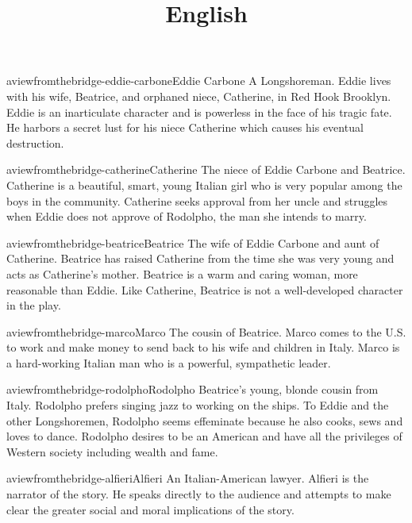 \documentclass[preview]{standalone}
\begin{document}
\title{English}
\genpage

\begin{snippetcharacter}{aviewfromthebridge-eddie-carbone}{Eddie Carbone}
    A Longshoreman. Eddie lives with his wife, Beatrice,
    and orphaned niece, Catherine, in Red Hook Brooklyn.
    Eddie is an inarticulate character and is powerless in the face of his tragic fate.
    He harbors a secret lust for his niece Catherine which causes his eventual destruction.
\end{snippetcharacter}

\begin{snippetcharacter}{aviewfromthebridge-catherine}{Catherine}
    The niece of Eddie Carbone and Beatrice. Catherine is a beautiful, smart, young Italian girl who is very popular among the boys in the community. Catherine seeks approval from her uncle and struggles when Eddie does not approve of Rodolpho, the man she intends to marry.
\end{snippetcharacter}

\begin{snippetcharacter}{aviewfromthebridge-beatrice}{Beatrice}
    The wife of Eddie Carbone and aunt of Catherine. Beatrice has raised Catherine from the time she was very young and acts as Catherine's mother. Beatrice is a warm and caring woman, more reasonable than Eddie. Like Catherine, Beatrice is not a well-developed character in the play.
\end{snippetcharacter}

\begin{snippetcharacter}{aviewfromthebridge-marco}{Marco}
    The cousin of Beatrice. Marco comes to the U.S. to work and make money to send back to his wife and children in Italy. Marco is a hard-working Italian man who is a powerful, sympathetic leader.
\end{snippetcharacter}

\begin{snippetcharacter}{aviewfromthebridge-rodolpho}{Rodolpho}
    Beatrice's young, blonde cousin from Italy. Rodolpho prefers singing jazz to working on the ships. To Eddie and the other Longshoremen, Rodolpho seems effeminate because he also cooks, sews and loves to dance. Rodolpho desires to be an American and have all the privileges of Western society including wealth and fame.
\end{snippetcharacter}

\begin{snippetcharacter}{aviewfromthebridge-alfieri}{Alfieri}
    An Italian-American lawyer. Alfieri is the narrator of the story. He speaks directly to the audience and attempts to make clear the greater social and moral implications of the story.
\end{snippetcharacter}
\end{document}
